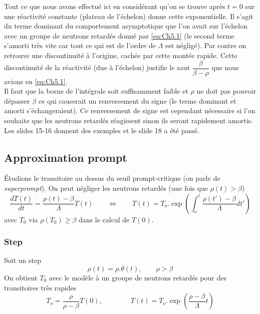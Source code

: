 Tout ce que nous avons effectué ici en considérant qu'on se trouve après $t=0$ sur une réactivité 
constante (plateau de l'échelon) donne cette exponentielle. Il s'agit du terme dominant du 
comportement asymptotique que l'on avait sur l'échelon avec un groupe de neutrons retardés donné 
par \eqref{eq:Ch5.1} (le second terme s'amorti très vite car tout ce qui est de l'ordre de 
$\Lambda$ est négligé). Par contre on retrouve une discontinuité à l'origine, cachée par cette 
montée rapide. Cette discontinuité de la réactivité (due à l'échelon) justifie le saut $\dfrac{
\beta}{\beta-\rho}$ que nous avions en \eqref{eq:Ch5.1}.\\

Il faut que la borne de l'intégrale soit suffisamment faible et $\rho$ ne doit pas pouvoir dépasser
$\beta$ ce qui causerait un renversement du signe (le terme dominant et amorti s'échangeraient). 
Ce renversement de signe est cependant nécessaire si l'on souhaite que les neutrons retardés 
réagissent sinon ils seront rapidement amortis. Les slides 15-16 donnent des exemples et le slide 
18 a été passé.



\subsection{Approximation prompt}
Étudions le transitoire au dessus du seuil prompt-critique (on parle de \textit{superprompt}). On peut
négliger les neutrons retardés (une fois que $\rho(t)>\beta$)
\begin{equation}
\frac{{dT(t)}}{{dt}} = \frac{{\rho (t) - \beta }}{\Lambda }T(t)\qquad\Leftrightarrow\qquad
T(t) = {T_o}.\exp \left( {\int_o^t    \frac{{\rho (t') - \beta }}{\Lambda }dt'} \right)
\end{equation}
avec $T_0$ via $\rho(T_0)\geq \beta$ dans le calcul de $T(0)$. 

\subsubsection{Step}
Soit un step
\begin{equation}
\rho(t) = \rho.\theta(t),\qquad\rho>\beta
\end{equation}
On obtient $T_0$ avec le modèle à un groupe de neutrons retardés pour des transitoires très rapides
\begin{equation}
{T_o} = \frac{\rho }{{\rho  - \beta }}T(0),\qquad\qquad T(t) = {T_o}.\exp \left( {\frac{{\rho  - \beta }}{\Lambda }t} \right)
\end{equation}

